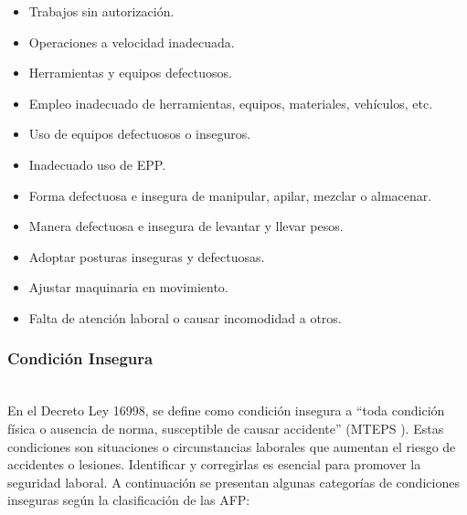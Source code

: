 \begin{table}[H]
    \begin{minipage}[t]{0.48\textwidth}
        \raggedright
        \begin{itemize}[wide=0pt]
            \item Trabajos sin autorización.
            \item Operaciones a velocidad inadecuada.
            \item Herramientas y equipos defectuosos.
            \item Empleo inadecuado de herramientas, equipos, materiales, vehículos, etc.
            \item Uso de equipos defectuosos o inseguros.
            \item Inadecuado uso de EPP.
        \end{itemize}
    \end{minipage}
    \hfill
    \begin{minipage}[t]{0.48\textwidth}
        \raggedright
        \begin{itemize}[wide=0pt]
            \item Forma defectuosa e insegura de manipular, apilar, mezclar o almacenar.
            \item Manera defectuosa e insegura de levantar y llevar pesos.
            \item Adoptar posturas inseguras y defectuosas.
            \item Ajustar maquinaria en movimiento.
            \item Falta de atención laboral o causar incomodidad a otros.
        \end{itemize}
    \end{minipage}
\end{table}

\subsubsection{Condición Insegura}\hfill\\
\indent
En el Decreto Ley 16998, se define como condición insegura a ``toda condición física o ausencia de norma, susceptible de causar accidente'' (MTEPS \citeyear{Bolivia1979}). Estas condiciones son situaciones o circunstancias laborales que aumentan el riesgo de accidentes o lesiones. Identificar y corregirlas es esencial para promover la seguridad laboral. A continuación se presentan algunas categorías de condiciones inseguras según la clasificación de las AFP:

